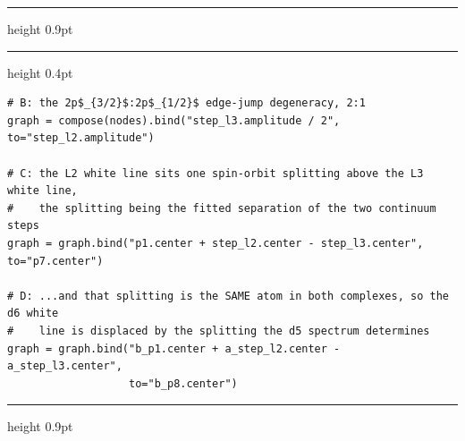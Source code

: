 \documentclass[border=6pt,varwidth=15.2cm]{standalone}
\begin{document}
\setcounter{lstlisting}{1}
\begin{minipage}{15.2cm}
\hrule height 0.9pt
\vspace{0.5em}
\vspace{0.2em}
\hrule height 0.4pt
\begin{lstlisting}
# B: the 2p$_{3/2}$:2p$_{1/2}$ edge-jump degeneracy, 2:1
graph = compose(nodes).bind("step_l3.amplitude / 2", to="step_l2.amplitude")

# C: the L2 white line sits one spin-orbit splitting above the L3 white line,
#    the splitting being the fitted separation of the two continuum steps
graph = graph.bind("p1.center + step_l2.center - step_l3.center", to="p7.center")

# D: ...and that splitting is the SAME atom in both complexes, so the d6 white
#    line is displaced by the splitting the d5 spectrum determines
graph = graph.bind("b_p1.center + a_step_l2.center - a_step_l3.center",
                   to="b_p8.center")
\end{lstlisting}
\vspace{0.3em}
\hrule height 0.9pt
\end{minipage}
\end{document}
